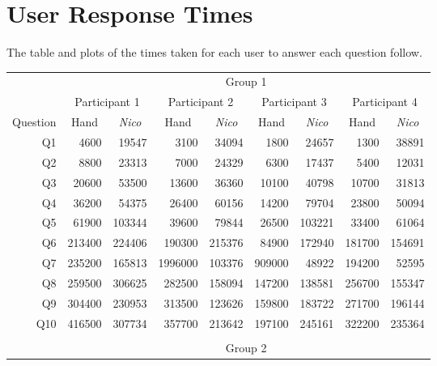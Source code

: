 \documentclass[12pt,twoside,notitlepage,xetex]{report}
\begin{document}
\chapter{User Response Times}

The table and plots of the times taken for each user to answer each question follow.

\begin{center}
\begin{table}[H]
\begin{center}
\begin{tabular}{|r||r|r||r|r||r|r||r|r|}
\cline{2-9}
\multicolumn{1}{c|}{} & \multicolumn{8}{c|}{Group 1}\\ \cline{2-9}
\multicolumn{1}{c|}{} & \multicolumn{2}{c||}{Participant 1} & \multicolumn{2}{c||}{Participant 2} & \multicolumn{2}{c||}{Participant 3} & \multicolumn{2}{c|}{Participant 4}\\ \hline
\multicolumn{1}{|c||}{Question} & \multicolumn{1}{c|}{Hand} & \multicolumn{1}{c||}{\emph{Nico}} & \multicolumn{1}{c|}{Hand} & \multicolumn{1}{c||}{\emph{Nico}} & \multicolumn{1}{c|}{Hand} & \multicolumn{1}{c||}{\emph{Nico}} & \multicolumn{1}{c|}{Hand} & \multicolumn{1}{c|}{\emph{Nico}}\\ \hline \hline
Q1 & 4600 & 19547 & 3100 & 34094 & 1800 & 24657 & 1300 & 38891\\ \hline
Q2 & 8800 & 23313 & 7000 & 24329 & 6300 & 17437 & 5400 & 12031\\ \hline
Q3 & 20600 & 53500 & 13600 & 36360 & 10100 & 40798 & 10700 & 31813\\ \hline
Q4 & 36200 & 54375 & 26400 & 60156 & 14200 & 79704 & 23800 & 50094\\ \hline
Q5 & 61900 & 103344 & 39600 & 79844 & 26500 & 103221 & 33400 & 61064\\ \hline
Q6 & 213400 & 224406 & 190300 & 215376 & 84900 & 172940 & 181700 & 154691\\ \hline
Q7 & 235200 & 165813 & 1996000 & 103376 & 909000 & 48922 & 194200 & 52595\\ \hline
Q8 & 259500 & 306625 & 282500 & 158094 & 147200 & 138581 & 256700 & 155347\\ \hline
Q9 & 304400 & 230953 & 313500 & 123626 & 159800 & 183722 & 271700 & 196144\\ \hline
Q10 & 416500 & 307734 & 357700 & 213642 & 197100 & 245161 & 322200 & 235364\\ \hline
\multicolumn{9}{c}{}\\ \cline{2-9}
\multicolumn{1}{c|}{} & \multicolumn{8}{c|}{Group 2}\\ \cline{2-9}

\end{tabular}
\end{center}
\end{table}
\end{center}
\end{document}
